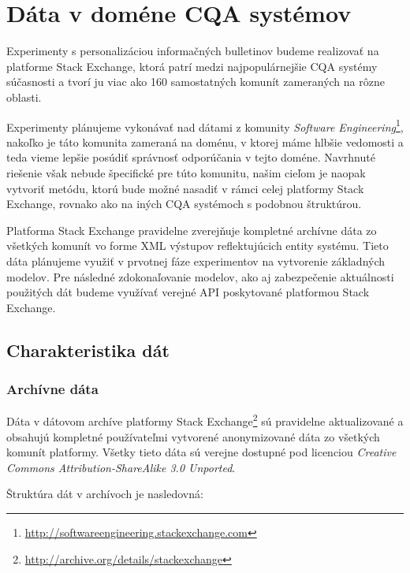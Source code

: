 \section{Dáta v doméne CQA systémov}

Experimenty s personalizáciou informačných bulletinov budeme realizovať na platforme Stack Exchange, ktorá patrí medzi
najpopulárnejšie CQA systémy súčasnosti a tvorí ju viac ako 160 samostatných komunít zameraných na rôzne oblasti.

Experimenty plánujeme vykonávať nad dátami z komunity \textit{Software Engineering}\footnote{\url{http://softwareengineering.stackexchange.com}},
nakoľko je táto komunita zameraná na doménu, v ktorej máme hlbšie vedomosti a teda vieme lepšie posúdiť správnosť
odporúčania v tejto doméne. Navrhnuté riešenie však nebude špecifické pre túto komunitu, našim cieľom je naopak vytvoriť
metódu, ktorú bude možné nasadiť v rámci celej platformy Stack Exchange, rovnako ako na iných CQA systémoch s podobnou
štruktúrou.

Platforma Stack Exchange pravidelne zverejňuje kompletné archívne dáta zo všetkých komunít vo forme XML výstupov reflektujúcich
entity systému. Tieto dáta plánujeme využiť v prvotnej fáze experimentov na vytvorenie základných modelov.
Pre následné zdokonaľovanie modelov, ako aj zabezpečenie aktuálnosti použitých dát budeme využívať verejné API poskytované
platformou Stack Exchange.

\subsection{Charakteristika dát}

\subsubsection{Archívne dáta}
Dáta v dátovom archíve platformy Stack Exchange\footnote{\url{http://archive.org/details/stackexchange}} sú pravidelne
aktualizované a obsahujú kompletné používateľmi vytvorené anonymizované dáta zo všetkých komunít platformy.
Všetky tieto dáta sú verejne dostupné pod licenciou \emph{Creative Commons Attribution-ShareAlike 3.0 Unported}.

Štruktúra dát v archívoch je nasledovná:

